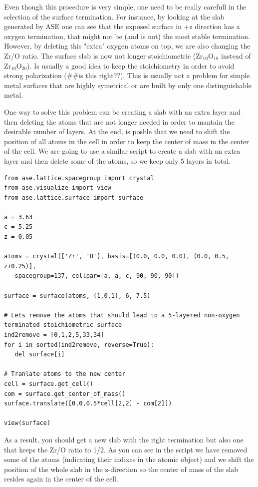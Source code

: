 \documentclass[11pt]{article}
\begin{document}
Even though this procedure is very simple, one need to be really carefull in the selection of the surface termination. For instance, by looking at the slab generated by ASE one can see that the exposed surface in +z direction has a oxygen termination, that might not be (and is not) the most stable termination. However, by deleting this "extra" oxygen atoms on top, we are also changing the Zr/O ratio. The surface slab is now not longer stoichiometric (Zr\(_{\text{10}}\)O\(_{\text{18}}\) instead of Zr\(_{\text{10}}\)O\(_{\text{20}}\)). Is usually a good idea to keep the stoichiometry in order to avoid strong polarization (\#\#is this right??). This is usually not a problem for simple metal surfaces that are highly symetrical or are built by only one distinguishable metal.

One way to solve this problem can be creating a slab with an extra layer and then deleting the atoms that are not longer needed in order to mantain the desirable number of layers. At the end, is posble that we need to shift the position of all atoms in the cell in order to keep the center of mass in the center of the cell. We are going to use a similar script to create a slab with an extra layer and then delete some of the atoms, so we keep only 5 layers in total.

\begin{verbatim}
from ase.lattice.spacegroup import crystal
from ase.visualize import view
from ase.lattice.surface import surface

a = 3.63
c = 5.25
z = 0.05

atoms = crystal(['Zr', 'O'], basis=[(0.0, 0.0, 0.0), (0.0, 0.5, z+0.25)],
   spacegroup=137, cellpar=[a, a, c, 90, 90, 90])

surface = surface(atoms, (1,0,1), 6, 7.5)

# Lets remove the atoms that should lead to a 5-layered non-oxygen terminated stoichiometric surface
ind2remove = [0,1,2,5,33,34]
for i in sorted(ind2remove, reverse=True):
   del surface[i]

# Tranlate atoms to the new center
cell = surface.get_cell()
com = surface.get_center_of_mass()
surface.translate([0,0,0.5*cell[2,2] - com[2]])

view(surface)
\end{verbatim}

As a result, you should get a new slab with the right termination but also one that keeps the Zr/O ratio to 1/2. As you can see in the script we have removed some of the atoms (indicating their indixes in the atomic object) and we shift the position of the whole slab in the z-direction so the center of mass of the slab resides again in the center of the cell.
\end{document}
